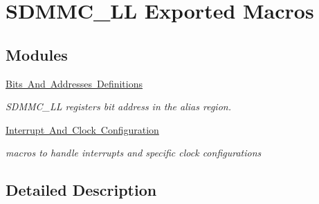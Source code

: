 \hypertarget{group___s_d_m_m_c___l_l___exported__macros}{}\section{S\+D\+M\+M\+C\+\_\+\+LL Exported Macros}
\label{group___s_d_m_m_c___l_l___exported__macros}
\subsection*{Modules}
\begin{DoxyCompactItemize}
\item 
\mbox{\hyperlink{group___s_d_m_m_c___l_l___register}{Bits And Addresses Definitions}}
\begin{DoxyCompactList}\small\item\em S\+D\+M\+M\+C\+\_\+\+LL registers bit address in the alias region. \end{DoxyCompactList}\item 
\mbox{\hyperlink{group___s_d_m_m_c___l_l___interrupt___clock}{Interrupt And Clock Configuration}}
\begin{DoxyCompactList}\small\item\em macros to handle interrupts and specific clock configurations \end{DoxyCompactList}\end{DoxyCompactItemize}


\subsection{Detailed Description}
